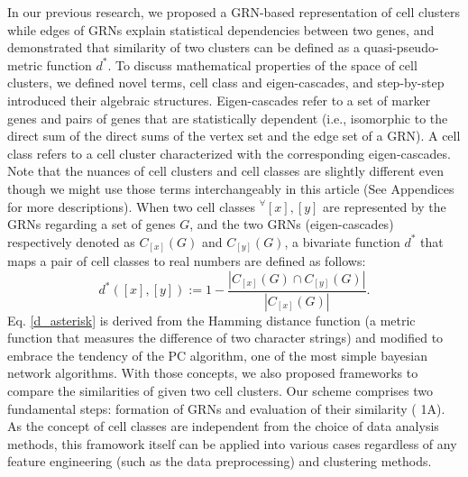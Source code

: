 \documentclass{article}
\begin{document}
In our previous research, we proposed a \ac{GRN}-based representation of cell clusters 
while edges of GRNs explain statistical dependencies between two genes, and demonstrated that similarity of two 
clusters can be defined as a quasi-pseudo-metric function $d^*$\cite{okano2023set}. To discuss mathematical properties of the space of 
cell clusters, we defined novel terms, cell class and eigen-cascades, and step-by-step introduced their algebraic 
structures. Eigen-cascades refer to a set of marker genes and pairs of genes that are statistically dependent (i.e., 
isomorphic to the direct sum of the direct sums of the vertex set and the edge set of a GRN). A cell class refers to 
a cell cluster characterized with the corresponding eigen-cascades. Note that the nuances of cell clusters and cell 
classes are slightly different even though we might use those terms interchangeably in this article (See Appendices 
for more descriptions). When two cell classes $^\forall[x], [y]$ are represented by the GRNs regarding a set of genes $G$, and 
the two GRNs (eigen-cascades) respectively denoted as $C_{[x]}(G)$ and $C_{[y]}(G)$, a bivariate function $d^*$ that maps a 
pair of cell classes to real numbers are defined as follows\cite{okano2023set}:
\begin{equation}\label{d_asterisk}
  d^*([x], [y]) := 1 - \frac{|C_{[x]}(G)\cap C_{[y]}(G)|}{|C_{[x]}(G)|}.
\end{equation}
Eq. \eqref{d_asterisk} is derived from the Hamming distance function (a metric function that measures the difference of two 
character strings) and modified to embrace the tendency of the \ac{PC} algorithm, one of the most 
simple bayesian network algorithms\cite{okano2023set,bookstein2002generalized, spirtes2000causation}. With those concepts, we also proposed frameworks to compare the 
similarities of given two cell clusters. Our scheme comprises two fundamental steps: formation of GRNs and 
evaluation of their similarity (\figurename{ 1A}). As the concept of cell classes are independent from the choice of data 
analysis methods, this framowork itself can be applied into various cases regardless of any feature engineering (such 
as the data preprocessing) and clustering methods.
\end{document}
